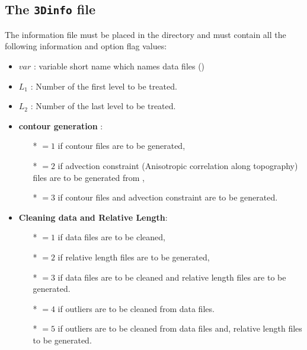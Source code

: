 \subsection{The \texttt{3Dinfo} file \label{sec:3Dinfo}}

The information file  must be placed in the  directory and must contain all the following information and option flag values:

\begin{itemize}
\item $var$ :  variable short name which names data files ()
\item $L_1$ :  Number of the first level to be treated. 
\item $L_2$ :  Number of the last level to be treated.
\item {\bf contour generation} : 
              \begin{itemize}
                \item[*] $=1$ if contour files are to be generated,
                \item[*] $=2$ if advection constraint (Anisotropic correlation along topography) files are to be generated from  ,
                \item[*] $=3$ if contour files and advection constraint are to be generated.
              \end{itemize}
\item {\bf Cleaning data and Relative Length}: 
              \begin{itemize}
                \item[*] $=1$ if data files are to be cleaned,
                \item[*] $=2$ if relative length files are to be generated,
                \item[*] $=3$ if data files are to be cleaned and relative length files are to be generated.
                \item[*] $=4$ if outliers are to be cleaned from data files.
                \item[*] $=5$ if outliers are to be cleaned from data files and, relative length files to be generated.
              \end{itemize}



\end{itemize}
